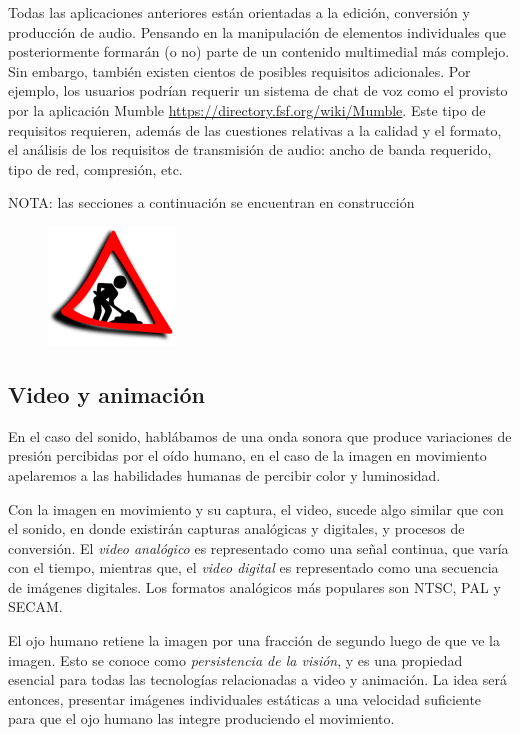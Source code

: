 \documentclass[12pt]{article}
\begin{document}
Todas las aplicaciones anteriores están orientadas a la edición, conversión 
y producción de audio. Pensando en la manipulación de elementos individuales
que posteriormente formarán (o no) parte de un contenido multimedial más 
complejo. Sin embargo, también existen cientos de posibles requisitos adicionales.
Por ejemplo, los usuarios podrían requerir un sistema de chat de voz como 
el provisto por la aplicación Mumble \url{https://directory.fsf.org/wiki/Mumble}. 
Este tipo de requisitos requieren, además de las cuestiones relativas a la calidad
y el formato, el análisis de los requisitos de transmisión de audio: ancho de banda 
requerido, tipo de red, compresión, etc. 

\textcolor[rgb]{1,0,0}{NOTA: las secciones a continuación se encuentran en 
construcción}

\begin{figure}[h]
\centering
\includegraphics{UN_CONSTRUCTION_2ss.png}
\renewcommand{\figurename}{Fig.}
\label{contexto:figura}
\end{figure}

\subsection*{Video y animación}
En el caso del sonido, hablábamos de una onda sonora
que produce variaciones de presión percibidas por el oído humano, en el caso 
de la imagen en movimiento apelaremos a las habilidades humanas de 
percibir color y luminosidad.  

Con la imagen en movimiento y su captura, el video, sucede algo similar que con 
el sonido, en donde existirán capturas analógicas y digitales, y procesos 
de conversión. El {\it video analógico} es representado como una señal continua, que varía con 
el tiempo, mientras que, el {\it video digital} es representado como una secuencia 
de imágenes digitales. Los formatos analógicos más populares son NTSC, PAL y SECAM.  

El ojo humano retiene la imagen por una fracción de segundo luego de 
que ve la imagen. Esto se conoce como {\it persistencia de la visión}, y es 
una propiedad esencial para todas las tecnologías relacionadas a video y 
animación. La idea será entonces, presentar imágenes individuales estáticas
a una velocidad suficiente para que el ojo humano las integre produciendo 
el movimiento. 
\end{document}
